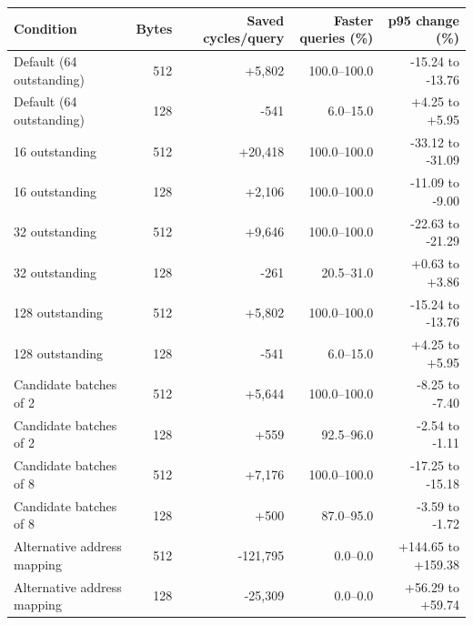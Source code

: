 \begin{tabular}{lrrrr}
\toprule
Condition & Bytes & Saved cycles/query & Faster queries (\%) & p95 change (\%) \\
\midrule
Default (64 outstanding) & 512 & +5,802 & 100.0--100.0 & -15.24 to -13.76 \\
Default (64 outstanding) & 128 & -541 & 6.0--15.0 & +4.25 to +5.95 \\
16 outstanding & 512 & +20,418 & 100.0--100.0 & -33.12 to -31.09 \\
16 outstanding & 128 & +2,106 & 100.0--100.0 & -11.09 to -9.00 \\
32 outstanding & 512 & +9,646 & 100.0--100.0 & -22.63 to -21.29 \\
32 outstanding & 128 & -261 & 20.5--31.0 & +0.63 to +3.86 \\
128 outstanding & 512 & +5,802 & 100.0--100.0 & -15.24 to -13.76 \\
128 outstanding & 128 & -541 & 6.0--15.0 & +4.25 to +5.95 \\
Candidate batches of 2 & 512 & +5,644 & 100.0--100.0 & -8.25 to -7.40 \\
Candidate batches of 2 & 128 & +559 & 92.5--96.0 & -2.54 to -1.11 \\
Candidate batches of 8 & 512 & +7,176 & 100.0--100.0 & -17.25 to -15.18 \\
Candidate batches of 8 & 128 & +500 & 87.0--95.0 & -3.59 to -1.72 \\
Alternative address mapping & 512 & -121,795 & 0.0--0.0 & +144.65 to +159.38 \\
Alternative address mapping & 128 & -25,309 & 0.0--0.0 & +56.29 to +59.74 \\
\bottomrule
\end{tabular}
